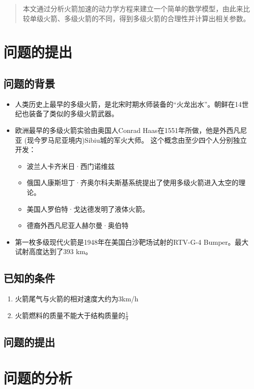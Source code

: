 \documentclass{JXUSTmodeling}
\begin{document}
\begin{abstract}
    本文通过分析火箭加速的动力学方程来建立一个简单的数学模型，由此来比较单级火箭、多级火箭的不同，得到多级火箭的合理性并计算出相关参数。
\end{abstract}
\section{问题的提出}\label{sec:1}
\subsection{问题的背景}\label{sub:1.1}
\begin{itemize}
    \item 人类历史上最早的多级火箭，是北宋时期水师装备的“火龙出水”。朝鲜在14世纪也装备了类似的多级火箭武器。
    \item 欧洲最早的多级火箭实验由奥国人Conrad Haas在1551年所做，他是外西凡尼亚 (现今罗马尼亚境内)Sibiu城的军火大师。 这个概念由至少四个人分别独立开发：
      \begin{itemize}
        \item 波兰人卡齐米日·西门诺维兹
        \item 俄国人康斯坦丁·齐奥尔科夫斯基系统提出了使用多级火箭进入太空的理论。
        \item 美国人罗伯特·戈达德发明了液体火箭。
        \item 德裔外西凡尼亚人赫尔曼·奥伯特
      \end{itemize}
      \item 第一枚多级现代火箭是1948年在美国白沙靶场试射的RTV-G-4 Bumper。最大试射高度达到了393 km。
  \end{itemize}
  
  
  
\subsection{已知的条件}\label{sub:1.2}
\begin{enumerate}
\item 火箭尾气与火箭的相对速度大约为3km/h
\item 火箭燃料的质量不能大于结构质量的$\frac{1}{9}$
\end{enumerate}
\subsection{问题的提出}\label{sub:1.3}

\section{问题的分析}\label{sec:2}
\end{document}
